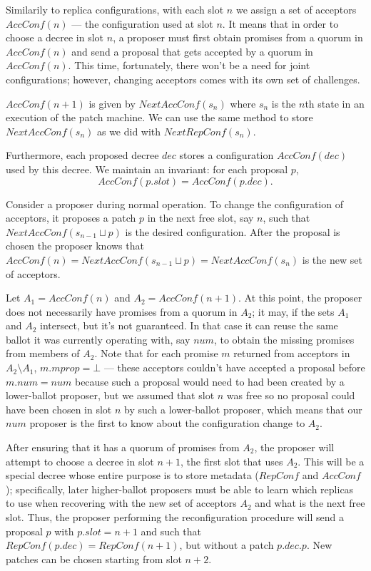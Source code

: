 \documentclass[12pt,a4paper,en]{pracamgr}
\begin{document}
Similarily to replica configurations, with each slot $n$ we assign a set of acceptors $AccConf(n)$ --- the configuration used at slot $n$. It means that in order to choose a decree in slot $n$, a proposer must first obtain promises from a quorum in $AccConf(n)$ and send a proposal that gets accepted by a quorum in $AccConf(n)$. This time, fortunately, there won't be a need for joint configurations; however, changing acceptors comes with its own set of challenges.

$AccConf(n+1)$ is given by $NextAccConf(s_n)$ where $s_n$ is the $n$th state in an execution of the patch machine. We can use the same method to store $NextAccConf(s_n)$ as we did with $NextRepConf(s_n)$.

Furthermore, each proposed decree $dec$ stores a configuration $AccConf(dec)$ used by this decree. We maintain an invariant: for each proposal $p$,
$$ AccConf(p.slot) = AccConf(p.dec). $$

Consider a proposer during normal operation. To change the configuration of acceptors, it proposes a patch $p$ in the next free slot, say $n$, such that $NextAccConf(s_{n-1} \sqcup p)$ is the desired configuration.
After the proposal is chosen the proposer knows that $AccConf(n) = NextAccConf(s_{n-1} \sqcup p) = NextAccConf(s_n)$ is the new set of acceptors.

Let $A_1 = AccConf(n)$ and $A_2 = AccConf(n+1)$. At this point, the proposer does not necessarily have promises from a quorum in $A_2$; it may, if the sets $A_1$ and $A_2$ intersect, but it's not guaranteed. In that case it can reuse the same ballot it was currently operating with, say $num$, to obtain the missing promises from members of $A_2$. Note that for each promise $m$ returned from acceptors in $A_2 \setminus A_1$, $m.mprop = \bot$ --- these acceptors couldn't have accepted a proposal before $m.num = num$ because such a proposal would need to had been created by a lower-ballot proposer, but we assumed that slot $n$ was free so no proposal could have been chosen in slot $n$ by such a lower-ballot proposer, which means that our $num$ proposer is the first to know about the configuration change to $A_2$.

After ensuring that it has a quorum of promises from $A_2$, the proposer will attempt to choose a decree in slot $n+1$, the first slot that uses $A_2$. This will be a special decree whose entire purpose is to store metadata ($RepConf$ and $AccConf$); specifically, later higher-ballot proposers must be able to learn which replicas to use when recovering with the new set of acceptors $A_2$ and what is the next free slot. Thus, the proposer performing the reconfiguration procedure will send a proposal $p$ with $p.slot = n+1$ and such that $RepConf(p.dec) = RepConf(n+1)$, but without a patch $p.dec.p$. New patches can be chosen starting from slot $n+2$.
\end{document}

